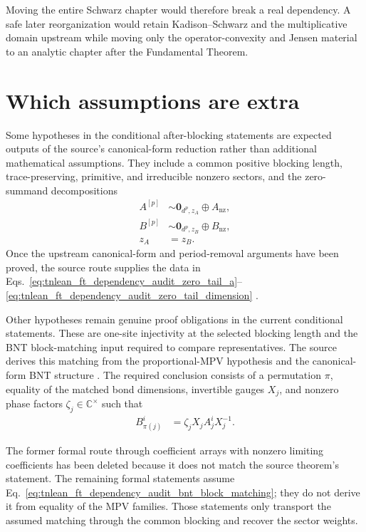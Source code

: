 \documentclass{article}
\begin{document}
Moving the entire Schwarz chapter would therefore break a real dependency. A
safe later reorganization would retain Kadison--Schwarz and the multiplicative
domain upstream while moving only the operator-convexity and Jensen material
to an analytic chapter after the Fundamental Theorem.

\section{Which assumptions are extra}

Some hypotheses in the conditional after-blocking statements are expected
outputs of the source's canonical-form reduction rather than additional
mathematical assumptions. They include a common positive blocking length,
trace-preserving, primitive, and irreducible nonzero sectors, and the
zero-summand decompositions
\begin{align}
    A^{[p]}
        &\sim \mathbf{0}_{d^p,z_A}\oplus A_{\mathrm{nz}},
    \label{eq:tnlean_ft_dependency_audit_zero_tail_a}\\
    B^{[p]}
        &\sim \mathbf{0}_{d^p,z_B}\oplus B_{\mathrm{nz}},
    \label{eq:tnlean_ft_dependency_audit_zero_tail_b}\\
    z_A
        &= z_B.
    \label{eq:tnlean_ft_dependency_audit_zero_tail_dimension}
\end{align}
Once the upstream canonical-form and period-removal arguments have been
proved, the source route supplies the data in
Eqs.~\ref{eq:tnlean_ft_dependency_audit_zero_tail_a}--%
\ref{eq:tnlean_ft_dependency_audit_zero_tail_dimension}
\cite{Cirac2016MPDO_arXiv,Cirac2021Matrix}.

Other hypotheses remain genuine proof obligations in the current conditional
statements. These are one-site injectivity at the selected blocking length and
the BNT block-matching input required to compare representatives. The source
derives this matching from the proportional-MPV hypothesis and the
canonical-form BNT structure \cite{Cirac2016MPDO_arXiv}. The required
conclusion consists of a permutation $\pi$, equality of the matched bond
dimensions, invertible gauges $X_j$, and nonzero phase factors
$\zeta_j\in\mathbb{C}^{\times}$ such that
\begin{align}
    B_{\pi(j)}^i
        &= \zeta_j X_j A_j^i X_j^{-1}.
    \label{eq:tnlean_ft_dependency_audit_bnt_block_matching}
\end{align}

The former formal route through coefficient arrays with nonzero limiting
coefficients has been deleted because it does not match the source theorem's
statement. The remaining formal statements assume
Eq.~\ref{eq:tnlean_ft_dependency_audit_bnt_block_matching}; they do not derive
it from equality of the MPV families. Those statements only transport the
assumed matching through the common blocking and recover the sector weights.
\end{document}
